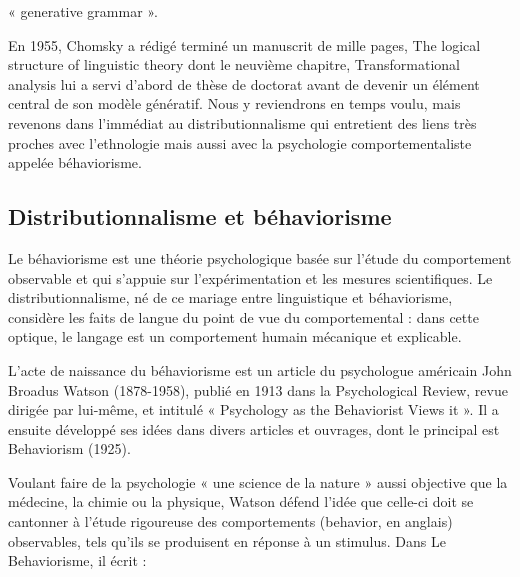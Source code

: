 « generative grammar ».\par

En 1955, Chomsky a rédigé terminé un manuscrit de mille pages, The logical structure of linguistic theory dont le neuvième chapitre, Transformational analysis lui a servi d’abord de thèse de doctorat avant de devenir un élément central de son modèle génératif. Nous y reviendrons en temps voulu, mais revenons dans l’immédiat au distributionnalisme qui entretient des liens très proches avec l’ethnologie mais aussi avec la psychologie comportementaliste appelée béhaviorisme.\par

\subsection{Distributionnalisme et béhaviorisme}

Le béhaviorisme est une théorie psychologique basée sur l’étude du comportement observable et qui s’appuie sur l’expérimentation et les mesures scientifiques. Le distributionnalisme, né de ce mariage entre linguistique et béhaviorisme, considère les faits de langue du point de vue du comportemental : dans cette optique, le langage est un comportement humain mécanique et explicable.\par


L’acte de naissance du béhaviorisme est un article du psychologue américain John Broadus Watson (1878-1958), publié en 1913 dans la Psychological Review, revue dirigée par lui-même, et intitulé « Psychology as the Behaviorist Views it ». Il a ensuite développé ses idées dans divers articles et ouvrages, dont le principal est Behaviorism (1925).\par


Voulant faire de la psychologie « une science de la nature » aussi objective que la médecine, la chimie ou la physique, Watson défend l’idée que celle-ci doit se cantonner à l’étude rigoureuse des comportements (behavior, en anglais) observables, tels qu’ils se produisent en réponse à un stimulus. Dans Le Behaviorisme, il écrit :\par

